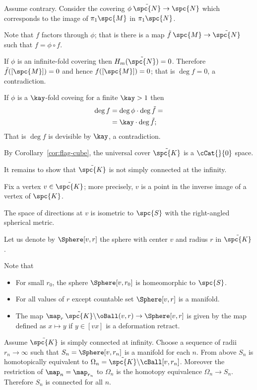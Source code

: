 Assume contrary.
Consider the covering $\phi\:\tilde{\spc{N}}\to \spc{N}$
which corresponds to the image of $\pi_1\spc{M}$
in $\pi_1\spc{N}$.

Note that $f$ factors through $\phi$;
that is there is a map $\tilde f\:\spc{M} \to \tilde{\spc{N}}$
such that $f=\phi\circ f$.



If $\phi$ is an infinite-fold covering then $H_m(\tilde{\spc{N}})=0$.
Therefore $\tilde f([\spc{M}])=0$ 
and hence $f([\spc{M}])=0$;
that is $\deg f=0$, a contradiction.

If $\phi$ is a $\kay$-fold coveing for a finite $\kay>1$
then 
\begin{align*}
\deg f
&=\deg\phi\cdot\deg \tilde f=
\\
&=\kay \cdot \deg \tilde f;
\end{align*}
That is $\deg f$ is devisible by $\kay$,
a contradiction.\qeds

By Corollary~\ref{cor:flag-cube}, the universal cover $\tilde{\spc{K}}$ is a $\cCat{}{0}$ space.

It remains to show that $\tilde{\spc{K}}$ is not simply connected at the infinity.

Fix a vertex $v\in \tilde{\spc{K}}$;
more precisely, $v$ is a point 
in the inverse image of a vertex of $\spc{K}$.

The space of directions at $v$
is isometric to $\spc{S}$
with the right-angled spherical metric.

Let us denote by $\Sphere[v,r]$ the sphere with center $v$ and  radius $r$ in $\tilde{\spc{K}}$.

Note that 
\begin{itemize}
\item For small $r_0$,
the sphere $\Sphere[v,r_0]$
is homeomorphic to $\spc{S}$.
\item For all values of $r$ except countable set 
$\Sphere[v,r]$ is a manifold.
\item
The map
$\map_r\:\tilde{\spc{K}}\backslash \oBall(v,r)\to \Sphere[v,r]$ 
is given by the map defined as $x\mapsto y$ if $y\in [vx]$
is a deformation retract.
\end{itemize}

Assume $\tilde{\spc{K}}$ is simply connected at infinity.
Choose a sequence of radii $r_n\to\infty$
such that $S_n=\Sphere[v,r_n]$ is a manifold for each $n$.
From above $S_n$ is homotopically equivalent to $\Omega_n=\tilde{\spc{K}}\backslash \cBall[v,r_n]$.
Moreover the restriction of $\map_n=\map_{r_n}$ to $\Omega_n$
is the homotopy equivalence $\Omega_n\to S_n$. 
Therefore $S_n$ is connected for all $n$.

